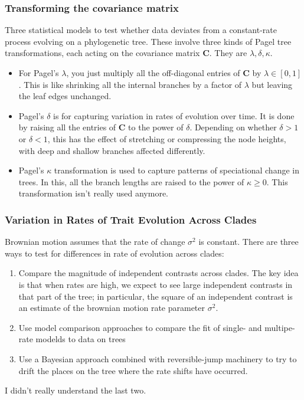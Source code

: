 \documentclass{article}
\newcommand{\bnote}[1]{{\blue #1 }} %
\begin{document}
\subsubsection{Transforming the covariance matrix}
Three statistical models to test whether data deviates from a constant-rate
process evolving on a phylogenetic tree. These involve three kinds of Pagel tree
transformations, each acting on the covariance matrix $\mathbf{C}$. They are $\lambda,\delta,\kappa$.
\begin{itemize}
  \item For Pagel's $\lambda$, you just multiply all the off-diagonal entries of
  \textbf{C} by $\lambda\in [0,1]$. This is like shrinking all the internal
  branches by a factor of $\lambda$ but leaving the leaf edges unchanged.
  \item Pagel's $\delta$ is for capturing variation in rates of evolution over time. It
  is done by raising all the entries of $\mathbf{C}$ to the power of $\delta$.
  Depending on whether $\delta>1$ or $\delta<1$, this has the effect of stretching
  or compressing the node heights, with deep and shallow branches affected
  differently.
  \item Pagel's $\kappa$ transformation is used to capture patterns of speciational
  change in trees. In this, all the branch lengths are raised to the power of
  $\kappa\geq 0$. This transformation isn't really used anymore.
\end{itemize}
\subsubsection{Variation in Rates of Trait Evolution Across Clades}
Brownian motion assumes that the rate of change $\sigma^{2}$ is constant. There
are three ways to test for differences in rate of evolution across clades:
\begin{enumerate}
\item Compare the magnitude of independent contrasts across clades. The key idea
  is that when rates are high, we expect to see large independent contrasts in
  that part of the tree; in particular, the square of an independent contrast is
  an estimate of the brownian motion rate parameter $\sigma^{2}$.
\item Use model comparison approaches to compare the fit of single- and
  multipe-rate modelds to data on trees
\item Use a Bayesian approach combined with reversible-jump machinery to try to
  drift the places on the tree where the rate shifts have occurred.
\end{enumerate}
\bnote{I didn't really understand the last two.}
\end{document}
